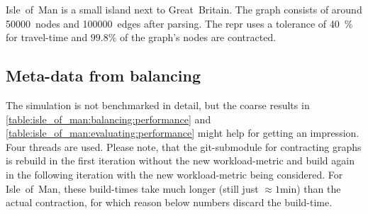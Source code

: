     Isle~of~Man is a small island next to Great~Britain.
    The graph consists of around \num{50000}~nodes and \num{100000}~edges after parsing.
    The \gls{repr} uses a tolerance of \si{40 \percent} for travel-time and $\si{\num{99.8} \percent}$ of the graph's nodes are contracted.

    \subsection{Meta-data from balancing}
    \label{chap:experiments:meta}

        The simulation is not benchmarked in detail, but the coarse results in \vref{table:isle_of_man:balancing:performance} and \vref{table:isle_of_man:evaluating:performance} might help for getting an impression.
        Four threads are used.
        Please note, that the git-submodule for contracting graphs is rebuild in the first iteration without the new workload-\gls{metric} and build again in the following iteration with the new workload-\gls{metric} being considered.
        For Isle~of~Man, these build-times take much longer (still just $\si{\approx 1 \minute}$) than the actual contraction, for which reason below numbers discard the build-time.
